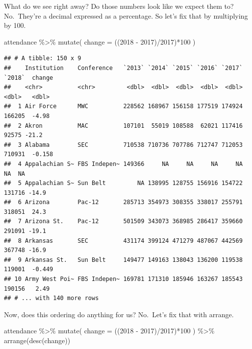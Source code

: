 \documentclass[
]{book}
\newenvironment{Shaded}{\begin{snugshade}}{\end{snugshade}}
\newcommand{\AttributeTok}[1]{\textcolor[rgb]{0.77,0.63,0.00}{#1}}
\newcommand{\DecValTok}[1]{\textcolor[rgb]{0.00,0.00,0.81}{#1}}
\newcommand{\FunctionTok}[1]{\textcolor[rgb]{0.00,0.00,0.00}{#1}}
\newcommand{\NormalTok}[1]{#1}
\newcommand{\SpecialCharTok}[1]{\textcolor[rgb]{0.00,0.00,0.00}{#1}}
\newcommand{\StringTok}[1]{\textcolor[rgb]{0.31,0.60,0.02}{#1}}
\begin{document}
What do we see right away? Do those numbers look like we expect them to? No.~They're a decimal expressed as a percentage. So let's fix that by multiplying by 100.

\begin{Shaded}
\begin{Highlighting}[]
\NormalTok{attendance }\SpecialCharTok{\%\textgreater{}\%} \FunctionTok{mutate}\NormalTok{(}
  \AttributeTok{change =}\NormalTok{ ((}\StringTok{\textasciigrave{}}\AttributeTok{2018}\StringTok{\textasciigrave{}} \SpecialCharTok{{-}} \StringTok{\textasciigrave{}}\AttributeTok{2017}\StringTok{\textasciigrave{}}\NormalTok{)}\SpecialCharTok{/}\StringTok{\textasciigrave{}}\AttributeTok{2017}\StringTok{\textasciigrave{}}\NormalTok{)}\SpecialCharTok{*}\DecValTok{100}
\NormalTok{) }
\end{Highlighting}
\end{Shaded}

\begin{verbatim}
## # A tibble: 150 x 9
##    Institution    Conference   `2013` `2014` `2015` `2016` `2017` `2018`  change
##    <chr>          <chr>         <dbl>  <dbl>  <dbl>  <dbl>  <dbl>  <dbl>   <dbl>
##  1 Air Force      MWC          228562 168967 156158 177519 174924 166205  -4.98 
##  2 Akron          MAC          107101  55019 108588  62021 117416  92575 -21.2  
##  3 Alabama        SEC          710538 710736 707786 712747 712053 710931  -0.158
##  4 Appalachian S~ FBS Indepen~ 149366     NA     NA     NA     NA     NA  NA    
##  5 Appalachian S~ Sun Belt         NA 138995 128755 156916 154722 131716 -14.9  
##  6 Arizona        Pac-12       285713 354973 308355 338017 255791 318051  24.3  
##  7 Arizona St.    Pac-12       501509 343073 368985 286417 359660 291091 -19.1  
##  8 Arkansas       SEC          431174 399124 471279 487067 442569 367748 -16.9  
##  9 Arkansas St.   Sun Belt     149477 149163 138043 136200 119538 119001  -0.449
## 10 Army West Poi~ FBS Indepen~ 169781 171310 185946 163267 185543 190156   2.49 
## # ... with 140 more rows
\end{verbatim}

Now, does this ordering do anything for us? No.~Let's fix that with arrange.

\begin{Shaded}
\begin{Highlighting}[]
\NormalTok{attendance }\SpecialCharTok{\%\textgreater{}\%} \FunctionTok{mutate}\NormalTok{(}
  \AttributeTok{change =}\NormalTok{ ((}\StringTok{\textasciigrave{}}\AttributeTok{2018}\StringTok{\textasciigrave{}} \SpecialCharTok{{-}} \StringTok{\textasciigrave{}}\AttributeTok{2017}\StringTok{\textasciigrave{}}\NormalTok{)}\SpecialCharTok{/}\StringTok{\textasciigrave{}}\AttributeTok{2017}\StringTok{\textasciigrave{}}\NormalTok{)}\SpecialCharTok{*}\DecValTok{100}
\NormalTok{) }\SpecialCharTok{\%\textgreater{}\%} \FunctionTok{arrange}\NormalTok{(}\FunctionTok{desc}\NormalTok{(change))}
\end{Highlighting}
\end{Shaded}
\end{document}
